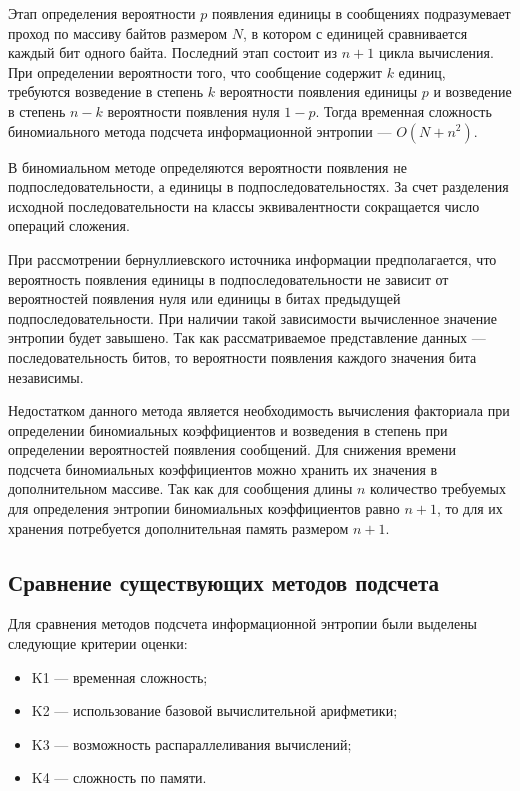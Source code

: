 Этап определения вероятности $p$ появления единицы в сообщениях подразумевает проход по массиву байтов размером $N$, в котором с единицей сравнивается каждый бит одного байта. Последний этап состоит из $n + 1$ цикла вычисления. При определении вероятности того, что сообщение содержит $k$ единиц, требуются возведение в степень $k$ вероятности появления единицы $p$ и возведение в степень $n - k$ вероятности появления нуля $1 - p$. Тогда временная сложность биномиального метода подсчета информационной энтропии --- $O(N + n^2)$.

В биномиальном методе определяются вероятности появления не подпоследовательности, а единицы в подпоследовательностях. За счет разделения исходной последовательности на классы эквивалентности сокращается число операций сложения.

При рассмотрении бернуллиевского источника информации предполагается, что вероятность появления единицы в подпоследовательности не зависит от вероятностей появления нуля или единицы в битах предыдущей подпоследовательности. При наличии такой зависимости вычисленное значение энтропии будет завышено. Так как рассматриваемое представление данных --- последовательность битов, то вероятности появления каждого значения бита независимы. 

Недостатком данного метода является необходимость вычисления факториала при определении биномиальных коэффициентов и возведения в степень при определении вероятностей появления сообщений. Для снижения времени подсчета биномиальных коэффициентов можно хранить их значения в дополнительном массиве. Так как для сообщения длины $n$ количество требуемых для определения энтропии биномиальных коэффициентов равно $n + 1$, то для их хранения потребуется дополнительная память размером $n + 1$.

\subsection{Сравнение существующих методов подсчета}

Для сравнения методов подсчета информационной энтропии были выделены следующие критерии оценки:

\begin{itemize}
	\item K1 --- временная сложность;
	\item K2 --- использование базовой вычислительной арифметики;
	\item K3 --- возможность распараллеливания вычислений;
	\item K4 --- сложность по памяти.
\end{itemize}

